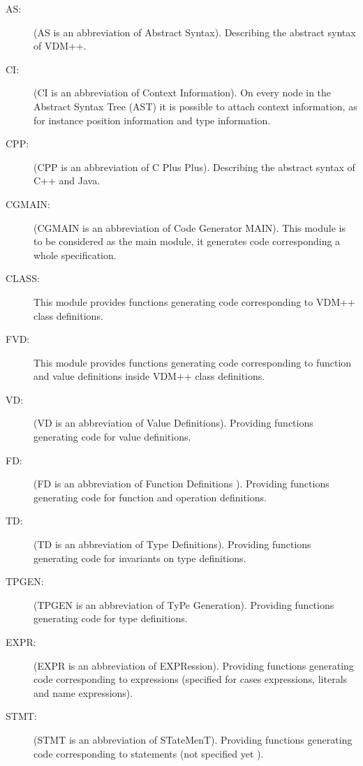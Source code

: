 \documentclass[a4paper,dvips]{article}
\begin{document}
\begin{description}
\item[AS: ] (AS is an abbreviation of Abstract Syntax). Describing the
  abstract syntax of VDM++.

\item[CI: ] (CI is an abbreviation of Context Information). 
On every node in the Abstract Syntax Tree (AST) it is possible to
attach context information, as for instance position information and
type information.

\item[CPP:] (CPP is an abbreviation of C Plus Plus). Describing the
  abstract syntax of C++ and Java.

\item[CGMAIN:] (CGMAIN is an abbreviation of Code Generator MAIN). This module is
  to be considered as the main module, it generates code corresponding
  a whole specification.

\item[CLASS:] This module provides functions generating code
  corresponding to VDM++ class definitions.

\item[FVD:] This module provides functions generating code
  corresponding to function and value definitions inside VDM++ class
  definitions.

\item[VD: ] (VD is an abbreviation of Value Definitions). Providing
  functions generating code for value definitions.

\item[FD: ] (FD is an abbreviation of Function Definitions ).
  Providing functions generating code for function and operation
  definitions.

\item[TD: ] (TD is an abbreviation of Type Definitions). Providing
  functions generating code for invariants on type definitions.

\item[TPGEN: ] (TPGEN is an abbreviation of TyPe Generation). Providing
  functions generating code for type definitions.

\item[EXPR: ] (EXPR is an abbreviation of EXPRession). Providing
  functions generating code corresponding to expressions (specified
  for cases expressions, literals and name expressions).

\item[STMT: ] (STMT is an abbreviation of STateMenT). Providing
  functions generating code corresponding to statements (not
  specified yet ).


\end{description}
\end{document}
